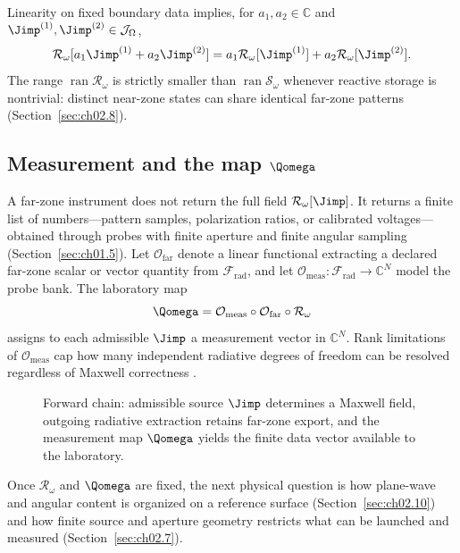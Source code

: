 Linearity on fixed boundary data implies, for $a_1,a_2\in\mathbb{C}$ and $\Jimp^{(1)},\Jimp^{(2)}\in\mathcal{J}_\Omega$,
\begin{equation}
\label{eq:ch2.R-linearity}
\mathcal{R}_\omega[a_1\Jimp^{(1)}+a_2\Jimp^{(2)}]
=a_1\mathcal{R}_\omega[\Jimp^{(1)}]+a_2\mathcal{R}_\omega[\Jimp^{(2)}].
\end{equation}
The range $\operatorname{ran}\mathcal{R}_\omega$ is strictly smaller than $\operatorname{ran}\mathcal{S}_\omega$ whenever reactive storage is nontrivial: distinct near-zone states can share identical far-zone patterns (Section~\ref{sec:ch02.8}).

\subsection[Measurement and the map \texorpdfstring{$\Qomega$}{Q\_omega}]{Measurement and the map $\Qomega$}
\label{sec:ch02.6.2}

A far-zone instrument does not return the full field $\mathcal{R}_\omega[\Jimp]$. It returns a finite list of numbers---pattern samples, polarization ratios, or calibrated voltages---obtained through probes with finite aperture and finite angular sampling (Section~\ref{sec:ch01.5}). Let $\mathcal{O}_{\mathrm{far}}$ denote a linear functional extracting a declared far-zone scalar or vector quantity from $\mathcal{F}_{\mathrm{rad}}$, and let $\mathcal{O}_{\mathrm{meas}}:\mathcal{F}_{\mathrm{rad}}\to\mathbb{C}^{N}$ model the probe bank. The laboratory map
\begin{equation}
\label{eq:ch2.Qomega-repeat}
\Qomega=\mathcal{O}_{\mathrm{meas}}\circ\mathcal{O}_{\mathrm{far}}\circ\mathcal{R}_\omega
\end{equation}
assigns to each admissible $\Jimp$ a measurement vector in $\mathbb{C}^{N}$. Rank limitations of $\mathcal{O}_{\mathrm{meas}}$ cap how many independent radiative degrees of freedom can be resolved regardless of Maxwell correctness \cite{harrington2001,hansen1988}.

\begin{figure}[t]
\centering
{}
\caption{Forward chain: admissible source $\Jimp$ determines a Maxwell field, outgoing radiative extraction retains far-zone export, and the measurement map $\Qomega$ yields the finite data vector available to the laboratory.}
\label{fig:ch2.forward-chain}
\end{figure}

Once $\mathcal{R}_\omega$ and $\Qomega$ are fixed, the next physical question is how plane-wave and angular content is organized on a reference surface (Section~\ref{sec:ch02.10}) and how finite source and aperture geometry restricts what can be launched and measured (Section~\ref{sec:ch02.7}).
